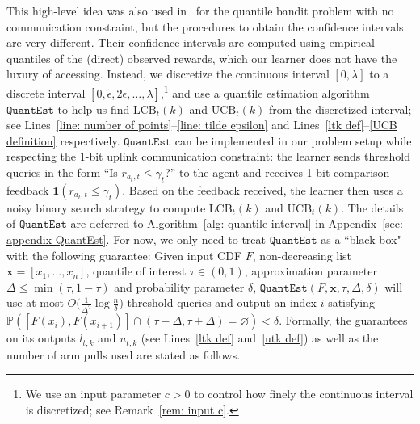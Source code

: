 This high-level idea was also used in~\cite{szorenyi2015qualitative, nikolakakis2021quantile} for the quantile bandit problem with no communication constraint, but the procedures to obtain the confidence intervals are very different.
Their confidence intervals are computed using empirical quantiles of the (direct) observed rewards, which our learner does not have the luxury of accessing. Instead, we discretize the continuous interval $[0, \lambda]$ to a discrete interval $\left[0, \tilde{\epsilon}, 2 \tilde{\epsilon},  \ldots,  \lambda\right]$,\footnote{We use an input parameter $c > 0$ to control how finely the continuous interval is discretized; see Remark~\ref{rem: input c}.} and use a quantile estimation algorithm $\mathtt{QuantEst}$
to help us find $\mathrm{LCB}_t(k)$ and $\mathrm{UCB}_t(k)$ from the discretized interval; see Lines~\ref{line: number of points}--\ref{line: tilde epsilon} and Lines~\ref{ltk def}--\ref{UCB definition} respectively.
$\mathtt{QuantEst}$ can be implemented in our problem setup while respecting the 1-bit uplink communication constraint: the learner sends threshold queries in the form ``Is $r_{a_t, t} \le \gamma_t$?'' to the agent and receives 1-bit comparison feedback $\mathbf{1}(r_{a_t, t} \le \gamma_t)$.
Based on the feedback received, the learner then uses a noisy binary search strategy to compute $\mathrm{LCB}_t(k)$ and $\mathrm{UCB}_t(k)$. 
The details of $\mathtt{QuantEst}$ are deferred to Algorithm~\ref{alg: quantile interval} in Appendix~\ref{sec: appendix QuantEst}. 
 For now, we only need to treat $\mathtt{QuantEst}$ as a ``black box" with the following guarantee: Given input CDF $F$, non-decreasing list $\mathbf{x} = [x_1, \ldots, x_n]$, quantile of interest $\tau \in (0, 1)$, approximation parameter $\Delta \le \min(\tau, 1-\tau)$ and probability parameter $\delta$, $\mathtt{QuantEst}(F, \mathbf{x}, \tau, \Delta, \delta)$ will use at most
$O \big( \frac{1}{\Delta^2}  \log  \frac{n}{\delta} \big)$
threshold queries and output an index $i$ satisfying
    $\mathbb{P}
    \left([F(x_i), F(x_{i+1})] \cap  (\tau - \Delta, \tau + \Delta) = \varnothing \right) < \delta$. 
 Formally, the guarantees on its outputs $l_{t, k}$ and $u_{t, k}$ (see Lines~\ref{ltk def} and~\ref{utk def}) as well as the number of arm pulls used are stated as follows.
